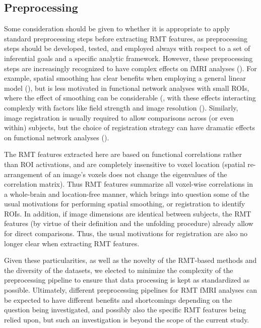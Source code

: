 \subsection{Preprocessing}
Some consideration should be given to whether it is appropriate to apply standard preprocessing
steps before extracting RMT features, as preprocessing steps should be developed, tested, and
employed always with respect to a set of inferential goals and a specific analytic framework.
However, these preprocessing steps are increasingly recognized to have complex effects on fMRI
analyses (\cite{parkerBenefitSliceTiming2019}). For example, spatial smoothing has clear benefits
when employing a general linear model
(\cite{miklEffectsSpatialSmoothing2008,alakorkkoEffectsSpatialSmoothing2017,worsleyAnalysisFMRITimeSeries1995}),
but is less motivated in functional network analyses with small ROIs, where the effect of smoothing
can be considerable
(\cite{alakorkkoEffectsSpatialSmoothing2017,goelmanMaximizingNegativeCorrelations2014,trianaEffectsSpatialSmoothing2020},
with these effects interacting complexly with factors like field strength and image resolution
(\cite{triantafyllouEffectSpatialSmoothing2006}). Similarly, image registration is usually required
to allow comparisons across (or even within) subjects, but the choice of registration strategy can
have dramatic effects on functional network analyses (\cite{magalhaesImpactNormalizationSegmentation2014}).

The RMT features extracted here are based on functional correlations rather than ROI activations,
and are completely insensitive to voxel location (spatial re-arrangement of an image’s voxels does
not change the eigenvalues of the correlation matrix). Thus RMT features summarize all voxel-wise
correlations in a whole-brain and location-free manner, which brings into question some of the usual
motivations for performing spatial smoothing, or registration to identify ROIs. In addition, if
image dimensions are identical between subjects, the RMT features (by virtue of their definition and
the unfolding procedure) already allow for direct comparisons. Thus, the usual motivations for
registration are also no longer clear when extracting RMT features.

Given these particularities, as well as the novelty of the RMT-based methods and the diversity of
the datasets, we elected to minimize the complexity of the preprocessing pipeline to ensure that
data processing is kept as standardized as possible. Ultimately, different preprocessing pipelines
for RMT fMRI analyses can be expected to have different benefits and shortcomings depending on the
question being investigated, and possibly also the specific RMT features being relied upon, but such
an investigation is beyond the scope of the current study.

